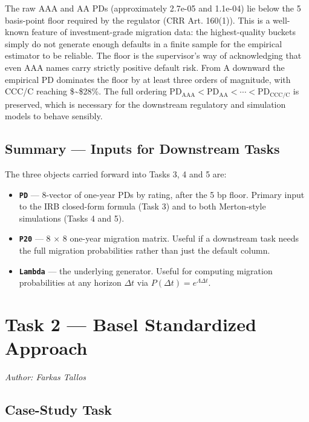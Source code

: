 \documentclass[
  11pt,
]{article}
\providecommand{\tightlist}{%
  \setlength{\itemsep}{0pt}\setlength{\parskip}{0pt}}
\begin{document}
The raw AAA and AA PDs (approximately 2.7e-05 and 1.1e-04) lie below the
5 basis-point floor required by the regulator (CRR Art. 160(1)). This is
a well-known feature of investment-grade migration data: the
highest-quality buckets simply do not generate enough defaults in a
finite sample for the empirical estimator to be reliable. The floor is
the supervisor's way of acknowledging that even AAA names carry strictly
positive default risk. From A downward the empirical PD dominates the
floor by at least three orders of magnitude, with CCC/C reaching
\$\sim\$28\%. The full ordering
\(\text{PD}_{\text{AAA}} < \text{PD}_{\text{AA}} < \cdots <
\text{PD}_{\text{CCC/C}}\) is preserved, which is necessary for the
downstream regulatory and simulation models to behave sensibly.

\subsection{Summary --- Inputs for Downstream
Tasks}\label{summary-inputs-for-downstream-tasks}

The three objects carried forward into Tasks 3, 4 and 5 are:

\begin{itemize}
\tightlist
\item
  \textbf{\texttt{PD}} --- 8-vector of one-year PDs by rating, after the
  5 bp floor. Primary input to the IRB closed-form formula (Task 3) and
  to both Merton-style simulations (Tasks 4 and 5).
\item
  \textbf{\texttt{P20}} --- 8 \(\times\) 8 one-year migration matrix.
  Useful if a downstream task needs the full migration probabilities
  rather than just the default column.
\item
  \textbf{\texttt{Lambda}} --- the underlying generator. Useful for
  computing migration probabilities at any horizon \(\Delta t\) via
  \(P(\Delta t) = e^{\Lambda \Delta t}\).
\end{itemize}

\section{Task 2 --- Basel Standardized
Approach}\label{task-2-basel-standardized-approach}

\emph{Author: Farkas Tallos}

\subsection{Case-Study Task}\label{case-study-task-1}
\end{document}
